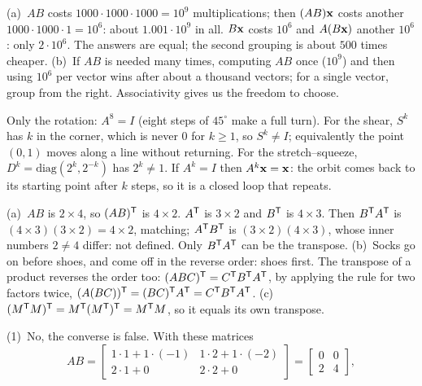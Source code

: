 \documentclass[11pt]{article}
\begin{document}
\begin{description}[leftmargin=0pt,itemsep=5pt]
  \item[Pause and think \ref{think:assoccost}.] (a)~$AB$ costs $1000\cdot1000\cdot1000=10^9$ multiplications; then $(AB)\mathbf{x}$ costs another $1000\cdot1000\cdot1=10^6$: about $1.001\cdot10^9$ in all. $B\mathbf{x}$ costs $10^6$ and $A(B\mathbf{x})$ another $10^6$: only $2\cdot10^6$. The answers are equal; the second grouping is about $500$ times cheaper. (b)~If $AB$ is needed many times, computing $AB$ once ($10^9$) and then using $10^6$ per vector wins after about a thousand vectors; for a single vector, group from the right. Associativity gives us the freedom to choose.
  \item[Pause and think \ref{think:powers}.] Only the rotation: $A^8=I$ (eight steps of $45^\circ$ make a full turn). For the shear, $S^k$ has $k$ in the corner, which is never $0$ for $k\ge1$, so $S^k\neq I$; equivalently the point $(0,1)$ moves along a line without returning. For the stretch--squeeze, $D^k=\mathrm{diag}(2^k,2^{-k})$ has $2^k\neq1$. If $A^k=I$ then $A^k\mathbf{x}=\mathbf{x}$: the orbit comes back to its starting point after $k$ steps, so it is a closed loop that repeats.
  \item[Pause and think \ref{think:reverse}.] (a)~$AB$ is $2\times4$, so $(AB)^{\mathsf T}$ is $4\times2$. $A^{\mathsf T}$ is $3\times2$ and $B^{\mathsf T}$ is $4\times3$. Then $B^{\mathsf T} A^{\mathsf T}$ is $(4\times3)(3\times2)=4\times2$, matching; $A^{\mathsf T} B^{\mathsf T}$ is $(3\times2)(4\times3)$, whose inner numbers $2\neq4$ differ: not defined. Only $B^{\mathsf T} A^{\mathsf T}$ can be the transpose. (b)~Socks go on before shoes, and come off in the reverse order: shoes first. The transpose of a product reverses the order too: $(ABC)^{\mathsf T}=C^{\mathsf T} B^{\mathsf T} A^{\mathsf T}$, by applying the rule for two factors twice, $(A(BC))^{\mathsf T}=(BC)^{\mathsf T} A^{\mathsf T}=C^{\mathsf T} B^{\mathsf T} A^{\mathsf T}$. (c)~$(M^{\mathsf T} M)^{\mathsf T}=M^{\mathsf T}(M^{\mathsf T})^{\mathsf T}=M^{\mathsf T} M$, so it equals its own transpose.
  \item[Pause and think \ref{think:habits}.] (1)~No, the converse is false. With these matrices
\[
AB=\begin{bmatrix}1\cdot1+1\cdot(-1)&1\cdot2+1\cdot(-2)\\2\cdot1+0&2\cdot2+0\end{bmatrix}=\begin{bmatrix}0&0\\2&4\end{bmatrix},
\]

\end{description}
\end{document}
